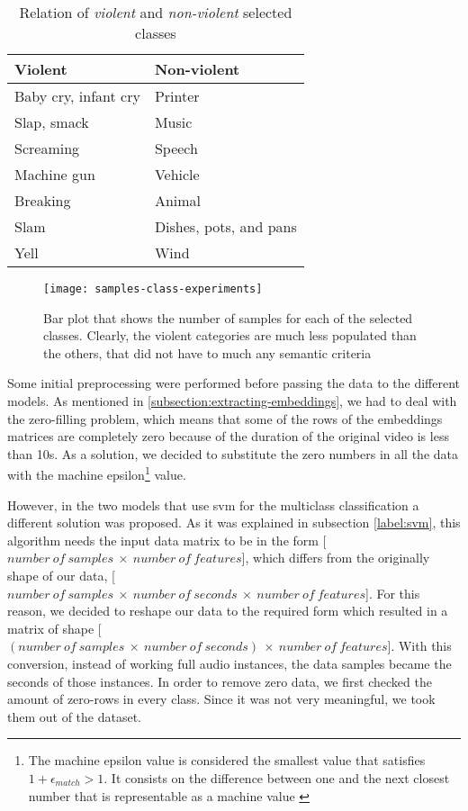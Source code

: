 	\begin{table}[ht]
		\centering
		\begin{tabular}{|| m{7em} | m{7em} ||}
			\hline
			\textbf{Violent} & \textbf{Non-violent} \\
			\hline\hline
			Baby cry, infant cry & Printer \\
			\hline
			Slap, smack & Music \\
			\hline
			Screaming & Speech \\
			\hline
			Machine gun & Vehicle \\
			\hline
			Breaking & Animal \\
			\hline
			Slam & Dishes, pots, and pans \\
			\hline
			Yell & Wind \\
			\hline
		\end{tabular}
	\caption{Relation of \textit{violent} and \textit{non-violent} selected classes}
	\label{table:7}
	\end{table}
	
	\begin{figure}[t]
		\centering
		\captionsetup{justification=centering}
		\texttt{[image: samples-class-experiments]}
		\caption{Bar plot that shows the number of samples for each of the selected classes. Clearly, the violent categories are much less populated than the others, that did not have to much any semantic criteria}
		\label{fig:mesh14}
	\end{figure}

	Some initial preprocessing were performed before passing the data to the different models. As mentioned in \ref{subsection:extracting-embeddings}, we had to deal with the zero-filling problem, which means that some of the rows of the embeddings matrices are completely zero because of the duration of the original video is less than 10s. As a solution, we decided to substitute the zero numbers in all the data with the machine epsilon\footnote{The machine epsilon value is considered the smallest value that satisfies $1 + \epsilon_{match} > 1$. It consists on the difference between one and the next closest number that is representable as a machine value \cite{Kaw}} value. 
	
	However, in the two models that use \acrshort{svm} for the multiclass classification a different solution was proposed. As it was explained in subsection \ref{label:svm}, this algorithm needs the input data matrix to be in the form [$number\ of\ samples\ \times\ number\ of\ features$], which differs from the originally shape of our data, [$number\ of\ samples\ \times\ number\ of\ seconds\ \times\ number\ of\ features$]. For this reason, we decided to reshape our data to the required form which resulted in a matrix of shape [$(number\ of\ samples\ \times\ number\ of\ seconds)\ \times\ number\ of\ features$]. With this conversion, instead of working  full audio instances, the data samples became the seconds of those instances. In order to remove zero data, we first checked the amount of zero-rows in every class. Since it was not very meaningful, we took them out of the dataset. 
	
